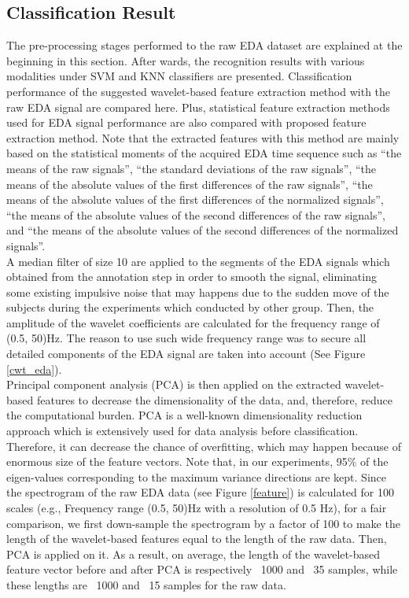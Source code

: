 \subsection{Classification Result}
The pre-processing stages performed to the raw EDA dataset are explained at the beginning in this section.
After wards, the recognition results with various modalities under SVM and KNN classifiers are presented. 
Classification performance of the suggested wavelet-based feature extraction method with the raw EDA signal
are compared here. Plus, statistical feature extraction methods \cite{liu2016human, mera2004emotion} 
used for EDA signal performance are also compared with proposed feature extraction method. Note that the extracted 
features with this method are mainly based on the statistical moments of the acquired EDA time sequence such as 
“the means of the raw signals”, “the standard deviations of the raw signals”, “the means of the absolute values 
of the first differences of the raw signals”, “the means of the absolute values of the first differences of 
the normalized signals”, “the means of the absolute values of the second differences of the raw signals”, 
and “the means of the absolute values of the second differences of the normalized signals”.\\

A median filter of size 10 are applied to the segments of the EDA signals which obtained from the annotation step
in order to smooth the signal, eliminating some existing impulsive noise that may happens due to the sudden move
of the subjects during the experiments which conducted by other group. Then, the amplitude of the wavelet 
coefficients are calculated for the frequency range of (0.5, 50)Hz. The reason to use such wide frequency
range was to secure all detailed components of the EDA signal are taken into account (See Figure \ref{cwt_eda}).\\

Principal component analysis (PCA) \cite{abdi2010principal} is then applied on the extracted wavelet-based 
features to decrease the dimensionality of the data, and, therefore, reduce the computational burden. 
PCA is a well-known dimensionality reduction approach which is extensively used for data analysis before 
classification. Therefore, it can decrease the chance of overfitting, which may happen because of  enormous
size of the feature vectors. Note that, in our experiments, 95\% of the eigen-values corresponding to the 
maximum variance directions are kept. Since the spectrogram of the raw EDA data (see Figure \ref{feature}) is calculated 
for 100 scales (e.g., Frequency range (0.5, 50)Hz with a resolution of 0.5 Hz), for a fair comparison, we 
first down-sample the spectrogram by a factor of 100 to make the length of the wavelet-based features equal 
to the length of the raw data. Then, PCA is applied on it. As a result, on average, the length of the 
wavelet-based feature vector before and after PCA is respectively ~1000 and ~35 samples, while these lengths 
are ~1000 and ~15 samples for the raw data.\\

